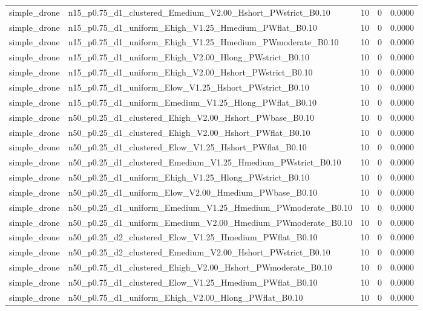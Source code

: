 \begin{tabular}{llrrr}
simple_drone & n15_p0.75_d1_clustered_Emedium_V2.00_Hshort_PWstrict_B0.10 & 10 & 0 & 0.0000 \\
simple_drone & n15_p0.75_d1_uniform_Ehigh_V1.25_Hmedium_PWflat_B0.10 & 10 & 0 & 0.0000 \\
simple_drone & n15_p0.75_d1_uniform_Ehigh_V1.25_Hmedium_PWmoderate_B0.10 & 10 & 0 & 0.0000 \\
simple_drone & n15_p0.75_d1_uniform_Ehigh_V2.00_Hlong_PWstrict_B0.10 & 10 & 0 & 0.0000 \\
simple_drone & n15_p0.75_d1_uniform_Ehigh_V2.00_Hshort_PWstrict_B0.10 & 10 & 0 & 0.0000 \\
simple_drone & n15_p0.75_d1_uniform_Elow_V1.25_Hshort_PWstrict_B0.10 & 10 & 0 & 0.0000 \\
simple_drone & n15_p0.75_d1_uniform_Emedium_V1.25_Hlong_PWflat_B0.10 & 10 & 0 & 0.0000 \\
simple_drone & n50_p0.25_d1_clustered_Ehigh_V2.00_Hshort_PWbase_B0.10 & 10 & 0 & 0.0000 \\
simple_drone & n50_p0.25_d1_clustered_Ehigh_V2.00_Hshort_PWflat_B0.10 & 10 & 0 & 0.0000 \\
simple_drone & n50_p0.25_d1_clustered_Elow_V1.25_Hshort_PWflat_B0.10 & 10 & 0 & 0.0000 \\
simple_drone & n50_p0.25_d1_clustered_Emedium_V1.25_Hmedium_PWstrict_B0.10 & 10 & 0 & 0.0000 \\
simple_drone & n50_p0.25_d1_uniform_Ehigh_V1.25_Hlong_PWstrict_B0.10 & 10 & 0 & 0.0000 \\
simple_drone & n50_p0.25_d1_uniform_Elow_V2.00_Hmedium_PWbase_B0.10 & 10 & 0 & 0.0000 \\
simple_drone & n50_p0.25_d1_uniform_Emedium_V1.25_Hmedium_PWmoderate_B0.10 & 10 & 0 & 0.0000 \\
simple_drone & n50_p0.25_d1_uniform_Emedium_V2.00_Hmedium_PWmoderate_B0.10 & 10 & 0 & 0.0000 \\
simple_drone & n50_p0.25_d2_clustered_Elow_V1.25_Hmedium_PWflat_B0.10 & 10 & 0 & 0.0000 \\
simple_drone & n50_p0.25_d2_clustered_Emedium_V2.00_Hshort_PWstrict_B0.10 & 10 & 0 & 0.0000 \\
simple_drone & n50_p0.75_d1_clustered_Ehigh_V2.00_Hshort_PWmoderate_B0.10 & 10 & 0 & 0.0000 \\
simple_drone & n50_p0.75_d1_clustered_Elow_V1.25_Hmedium_PWflat_B0.10 & 10 & 0 & 0.0000 \\
simple_drone & n50_p0.75_d1_uniform_Ehigh_V2.00_Hlong_PWflat_B0.10 & 10 & 0 & 0.0000 \\

\end{tabular}
